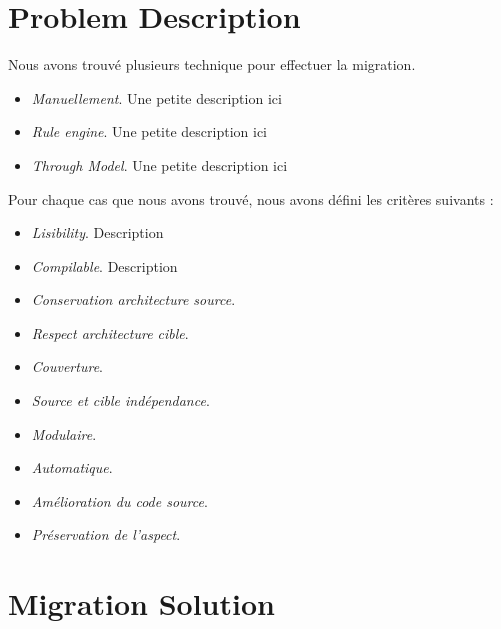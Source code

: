 \documentclass[conference]{IEEEtran}
\begin{document}
\section{Problem Description}
\label{sec:problem}

Nous avons trouvé plusieurs technique pour effectuer la migration. 

\begin{itemize}

    \item \textit{Manuellement}. Une petite description ici

    \item \textit{Rule engine}. Une petite description ici

    \item \textit{Through Model}. Une petite description ici

\end{itemize}

Pour chaque cas que nous avons trouvé, nous avons défini les critères suivants : 

\begin{itemize}

    \item \textit{Lisibility}. Description

    \item \textit{Compilable}. Description

    \item \textit{Conservation architecture source}.

    \item \textit{Respect architecture cible}.

    \item \textit{Couverture}.

    \item \textit{Source et cible indépendance}.

    \item \textit{Modulaire}.

    \item \textit{Automatique}.

    \item \textit{Amélioration du code source}.

    \item \textit{Préservation de l'aspect}.

\end{itemize}


\section{Migration Solution}
\label{sec:Solution}
\end{document}
